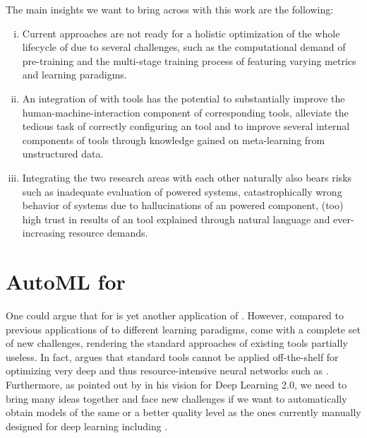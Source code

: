 The main insights we want to bring across with this work are the following: 
\begin{enumerate}[(i)]
    \item Current \AutoML approaches are not ready for a holistic optimization of the whole lifecycle of \LLMs due to several challenges, such as the computational demand of pre-training and the multi-stage training process of \LLMs featuring varying metrics and learning paradigms. 
    \item An integration of \LLMs with \AutoML tools has the potential to substantially improve the human-machine-interaction component of corresponding tools, alleviate the tedious task of correctly configuring an \AutoML tool and to improve several internal components of \AutoML tools through knowledge gained on meta-learning from unstructured data.
    \item Integrating the two research areas with each other naturally also bears risks such as inadequate evaluation of \LLM powered \AutoML systems, catastrophically wrong behavior of \AutoML systems due to hallucinations of an \LLM powered component, (too) high trust in results of an \AutoML tool explained through natural language and ever-increasing resource demands.
\end{enumerate}

\section{AutoML for \LLMs}
\label{llm-sec:automl-for-llms}

One could argue that \AutoML for \LLMs is yet another application of \AutoML. However, compared to previous applications of \AutoML to different learning paradigms, \LLMs come with a complete set of new challenges, rendering the standard approaches of existing \AutoML tools partially useless. In fact, \citet{godbole-github23} argues that standard \HPO tools cannot be applied off-the-shelf for optimizing very deep and thus resource-intensive neural networks such as \LLMs. Furthermore, as pointed out by \cite{hutter-blog22a} in his vision for Deep Learning 2.0, we need to bring many ideas together and face new challenges if we want to automatically obtain models of the same or a better quality level as the ones currently manually designed for deep learning including \LLMs.

